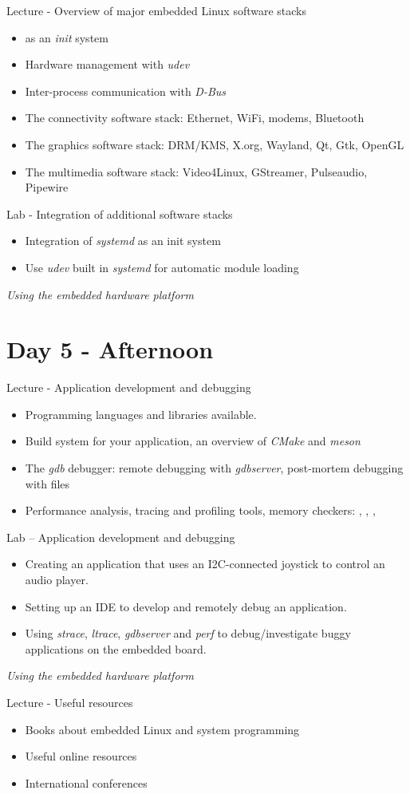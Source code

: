 \documentclass[a4paper,12pt,obeyspaces,spaces,hyphens]{article}
\begin{document}
\feagendatwocolumn
{Lecture - Overview of major embedded Linux software stacks}
{
  \begin{itemize}
  \item {} as an {\em init} system
  \item Hardware management with {\em udev}
  \item Inter-process communication with {\em D-Bus}
  \item The connectivity software stack: Ethernet, WiFi, modems,
    Bluetooth
  \item The graphics software stack: DRM/KMS, X.org, Wayland, Qt, Gtk,
    OpenGL
  \item The multimedia software stack: Video4Linux, GStreamer,
    Pulseaudio, Pipewire
  \end{itemize}
}
{Lab - Integration of additional software stacks}
{
  \begin{itemize}
  \item Integration of {\em systemd} as an init system
  \item Use {\em udev} built in {\em systemd} for automatic module
    loading
  \end{itemize}

  \vspace{0.5cm}
  {\em Using the embedded hardware platform}
}

\section{Day 5 - Afternoon}

\feagendatwocolumn
{Lecture - Application development and debugging}
{
  \begin{itemize}
  \item Programming languages and libraries available.
  \item Build system for your application, an overview of {\em CMake}
    and {\em meson}
  \item The {\em gdb} debugger: remote debugging with {\em gdbserver},
    post-mortem debugging with  files
  \item Performance analysis, tracing and profiling tools, memory
    checkers: , , ,
  \end{itemize}
}
{Lab – Application development and debugging}
{
  \begin{itemize}
  \item Creating an application that uses an I2C-connected joystick to
    control an audio player.
  \item Setting up an IDE to develop and remotely debug an
    application.
  \item Using {\em strace}, {\em ltrace}, {\em gdbserver} and {\em
      perf} to debug/investigate buggy applications on the embedded
    board.
  \end{itemize}

  \vspace{0.5cm}
  {\em Using the embedded hardware platform}
}

\feagendaonecolumn
{Lecture - Useful resources}
{
  \begin{itemize}
  \item Books about embedded Linux and system programming
  \item Useful online resources
  \item International conferences
  \end{itemize}
}
\end{document}
